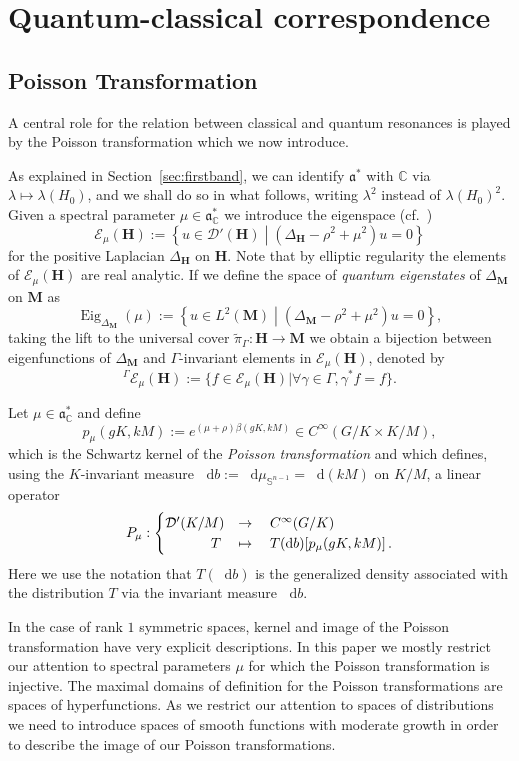 \documentclass[AHL, Unicode, longabstracts, published]{cedram}
\DeclareMathOperator{\Eig}{Eig}
\newcommand{\cc}{\mathbb{C}}
\newcommand{\bfh}{\mathbf{H}}
\newcommand{\bfm}{\mathbf{M}}
\newcommand{\la}{\lambda}
\newcommand{\til}{\widetilde}
\newcommand{\intd}{\mathop{}\!\mathrm{d}}
\renewcommand{\a}{\mathfrak a}
\let\oldforall\forall
\renewcommand*{\forall}{\mathrel{\oldforall}}
\begin{document}
\section{Quantum-classical correspondence}
\subsection{Poisson Transformation}
A central role for the relation between classical and quantum resonances is played by the Poisson transformation which we now introduce.

As explained in Section~\ref{sec:firstband}, we can identify $\mathfrak{a}^*$ with $\cc$ via $\la\mapsto \la(H_0)$, and we shall do so in what follows, writing $\la^2$ instead of $\la(H_0)^2$. Given a spectral parameter $\mu\in \mathfrak a_\cc^*$ we introduce the eigenspace (cf.~\cite{vBS87})
\[
\mathcal E_\mu({\bfh}) :=\left\{u\in \mathcal D'({\bfh})\middle| \left(\Delta_{{\bfh}}-\rho^2+\mu^2\right) u=0\right\}
\]
for the positive Laplacian $\Delta_{{\bfh}}$ on ${\bfh}$. Note that by elliptic regularity the elements of $\mathcal E_\mu({\bfh})$ are real analytic. If we define the space of \emph{quantum eigenstates} of $\Delta_{\bfm}$ on ${\bfm}$ as
\[
\Eig_{\Delta_{\bfm}}(\mu) :=\left\{u\in L^2({\bfm})\middle| \left(\Delta_{\bfm} -\rho^2+\mu^2\right) u=0\right\},
\]
taking the lift to the universal cover $\til\pi_{\Gamma}: {\bfh} \to {\bfm}$ we obtain a bijection between eigenfunctions of $\Delta_{\bfm}$ and $\Gamma$-invariant elements in $\mathcal E_\mu({\bfh})$, denoted by
\[
^\Gamma \mathcal E_\mu({\bfh}):=\{f\in \mathcal E_\mu({\bfh})\mid \forall \gamma\in \Gamma, \gamma^*f=f\}.
\]

\begin{defi}
Let $\mu\in\a^*_\cc$ and define
\[
p_\mu(gK, kM) := e^{(\mu+\rho) \beta(gK,kM)} \in C^\infty(G/K\times K/M),
\]
which is the Schwartz kernel of the \emph{Poisson transformation} and which defines, using the $K$-invariant measure $\intd b:=\intd \mu_{\mathbb S^ {n-1}} = \intd(kM)$ on $K/M$, a linear operator
\[
P_\mu: 
\begin{cases}
\mathcal D'(K/M) &\rightarrow\quad C^\infty(G/K)\\
\mkern 59mu T &\mapsto\quad T(\intd b)[p_\mu(gK,kM)]\,.
\end{cases}
\]
Here we use the notation that $T(\intd b)$ is the generalized density associated with the distribution $T$ via the invariant measure $\intd b$.
\end{defi}

In the case of rank $1$ symmetric spaces, kernel and image of the Poisson transformation have very explicit descriptions. In this paper we mostly restrict our attention to spectral parameters $\mu$ for which the Poisson transformation is injective. The maximal domains of definition for the Poisson transformations are spaces of hyperfunctions. As we restrict our attention to spaces of distributions we need to introduce spaces of smooth functions with moderate growth in order to describe the image of our Poisson transformations.
\end{document}
